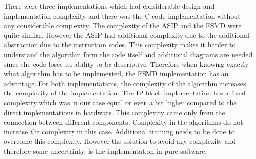 \documentclass[conference]{IEEEtran}
\begin{document}
There were three implementations which had considerable design and implementation complexity and there was the C-code implementation without any considerable complexity. The complexity of the ASIP and the FSMD were quite similar. However the ASIP had additional complexity due to the additional abstraction due to the instruction codes. This complexity makes it harder to understand the algorithm form the code itself and additional diagrams are needed since the code loses its ability to be descriptive. Therefore when knowing exactly what algorithm has to be implemented, the FSMD implementation has an advantage. For both implementations, the complexity of the algorithm increases the complexity of the implementation. The IP block implementation has a fixed complexity which was in our case equal or even a bit higher compared to the direct implementations in hardware. This complexity came only from the connection between different components. Complexity in the algorithms do not increase the complexity in this case. Additional training needs to be done to overcome this complexity. However the solution to avoid any complexity and therefore some uncertainty, is the implementation in pure software.
\end{document}
